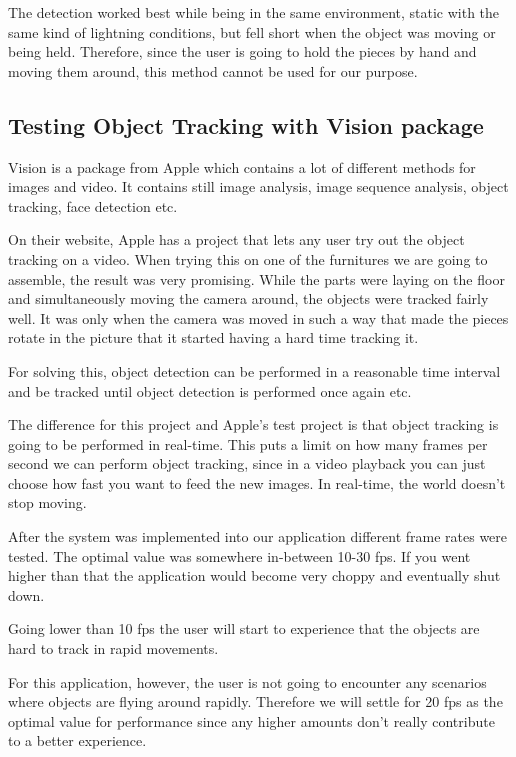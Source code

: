 The detection worked best while being in the same environment, static with the same kind of lightning conditions, but fell short when the object was moving or being held. Therefore, since the user is going to hold the pieces by hand and moving them around, this method cannot be used for our purpose.

\subsection{Testing Object Tracking with Vision package}
Vision is a package from Apple which contains a lot of different methods for images and video. It contains still image analysis, image sequence analysis, object tracking, face detection etc.

On their website, Apple has a project that lets any user try out the object tracking on a video. When trying this on one of the furnitures we are going to assemble, the result was very promising. While the parts were laying on the floor and simultaneously moving the camera around, the objects were tracked fairly well. It was only when the camera was moved in such a way that made the pieces rotate in the picture that it started having a hard time tracking it.

For solving this, object detection can be performed in a reasonable time interval and be tracked until object detection is performed once again etc.

\cite{ObjectTracking}
The difference for this project and Apple's test project is that object tracking is going to be performed in real-time. This puts a limit on how many frames per second we can perform object tracking, since in a video playback you can just choose how fast you want to feed the new images. In real-time, the world doesn't stop moving.

After the system was implemented into our application different frame rates were tested. The optimal value was somewhere in-between 10-30 fps. If you went higher than that the application would become very choppy and eventually shut down.

Going lower than 10 fps the user will start to experience that the objects are hard to track in rapid movements.

For this application, however, the user is not going to encounter any scenarios where objects are flying around rapidly. Therefore we will settle for 20 fps as the optimal value for performance since any higher amounts don't really contribute to a better experience.

